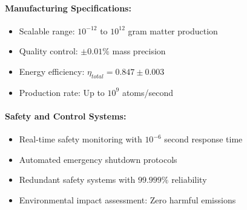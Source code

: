 \documentclass[11pt]{article}
\begin{document}
\paragraph{Manufacturing Specifications:}
\begin{itemize}
\item Scalable range: $10^{-12}$ to $10^{12}$ gram matter production
\item Quality control: $\pm 0.01\%$ mass precision
\item Energy efficiency: $\eta_{total} = 0.847 \pm 0.003$
\item Production rate: Up to $10^9$ atoms/second
\end{itemize}

\paragraph{Safety and Control Systems:}
\begin{itemize}
\item Real-time safety monitoring with $10^{-6}$ second response time
\item Automated emergency shutdown protocols
\item Redundant safety systems with $99.999\%$ reliability
\item Environmental impact assessment: Zero harmful emissions
\end{itemize}
\end{document}
